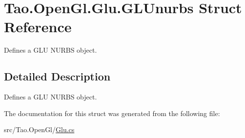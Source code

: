 \hypertarget{struct_tao_1_1_open_gl_1_1_glu_1_1_g_l_unurbs}{
\section{Tao.OpenGl.Glu.GLUnurbs Struct Reference}
\label{struct_tao_1_1_open_gl_1_1_glu_1_1_g_l_unurbs}
}


Defines a GLU NURBS object.  




\subsection{Detailed Description}
Defines a GLU NURBS object. 

The documentation for this struct was generated from the following file:\begin{DoxyCompactItemize}
\item 
src/Tao.OpenGl/\hyperlink{_glu_8cs}{Glu.cs}\end{DoxyCompactItemize}
